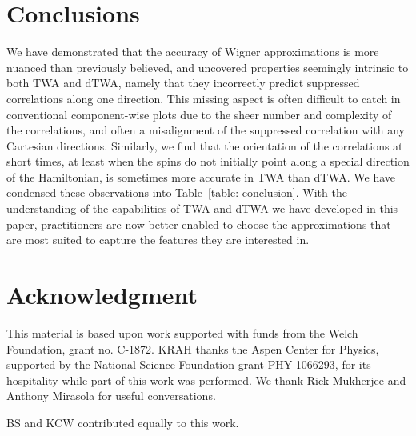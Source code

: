 \documentclass[pra,reprint,superscriptaddress]{revtex4-1}
\begin{document}
\section{Conclusions}\label{sec: conclusions}
We have demonstrated that the accuracy of Wigner approximations is more nuanced than previously believed, and uncovered properties seemingly intrinsic to both TWA and dTWA, namely that they incorrectly predict suppressed correlations along one direction. This missing aspect is often difficult to catch in conventional component-wise plots due to the sheer number and complexity of the correlations, and often a misalignment of the suppressed correlation with any Cartesian directions. Similarly, we find that the orientation of the correlations at short times, at least when the spins do not initially point along a special direction of the Hamiltonian, is sometimes more accurate in TWA than dTWA. We have condensed these observations into Table~\ref{table: conclusion}. With the understanding of the capabilities of TWA and dTWA we have developed in this paper, practitioners are now better enabled to choose the approximations that are most suited to capture the features they are interested in.

\section*{Acknowledgment}
This material is based upon work supported with funds from the Welch Foundation, grant no. C-1872. KRAH thanks the Aspen Center for Physics, supported by the National Science Foundation grant PHY-1066293, for its hospitality while part of this work was performed. We thank Rick Mukherjee and Anthony Mirasola for useful conversations.

BS and KCW contributed equally to this work.
\end{document}
